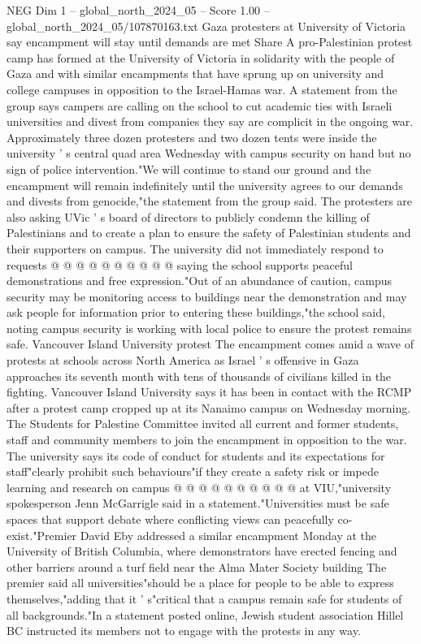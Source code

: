 \begin{textsample}{NEG Dim 1 – global\_north\_2024\_05 – Score 1.00 – global\_north\_2024\_05/107870163.txt}  \label{ex:f1_neg_047}
Gaza protesters at University of Victoria say encampment will stay until demands are met Share A pro-Palestinian protest camp has formed at the University of Victoria in solidarity with the people of Gaza and with similar encampments that have sprung up on university and college campuses in opposition to the Israel-Hamas war.
A statement from the group says campers are calling on the school to cut academic ties with Israeli universities and divest from companies they say are complicit in the ongoing war.
Approximately three dozen protesters and two dozen tents were inside the university ' s central quad area Wednesday with campus security on hand but no sign of police intervention."We will continue to stand our ground and the encampment will remain indefinitely until the university agrees to our demands and divests from genocide,"the statement from the group said.
The protesters are also asking UVic ' s board of directors to publicly condemn the killing of Palestinians and to create a plan to ensure the safety of Palestinian students and their supporters on campus.
The university did not immediately respond to requests @ @ @ @ @ @ @ @ @ @ saying the school supports peaceful demonstrations and free expression."Out of an abundance of caution, campus security may be monitoring access to buildings near the demonstration and may ask people for information prior to entering these buildings,"the school said, noting campus security is working with local police to ensure the protest remains safe.
Vancouver Island University protest The encampment comes amid a wave of protests at schools across North America as Israel ' s offensive in Gaza approaches its seventh month with tens of thousands of civilians killed in the fighting.
Vancouver Island University says it has been in contact with the RCMP after a protest camp cropped up at its Nanaimo campus on Wednesday morning.
The Students for Palestine Committee invited all current and former students, staff and community members to join the encampment in opposition to the war.
The university says its code of conduct for students and its expectations for staff"clearly prohibit such behaviours"if they create a safety risk or impede learning and research on campus @ @ @ @ @ @ @ @ @ @ at VIU,"university spokesperson Jenn McGarrigle said in a statement."Universities must be safe spaces that support debate where conflicting views can peacefully co-exist."Premier David Eby addressed a similar encampment Monday at the University of British Columbia, where demonstrators have erected fencing and other barriers around a turf field near the Alma Mater Society building The premier said all universities"should be a place for people to be able to express themselves,"adding that it ' s"critical that a campus remain safe for students of all backgrounds."In a statement posted online, Jewish student association Hillel BC instructed its members not to engage with the protests in any way.

\end{textsample}
